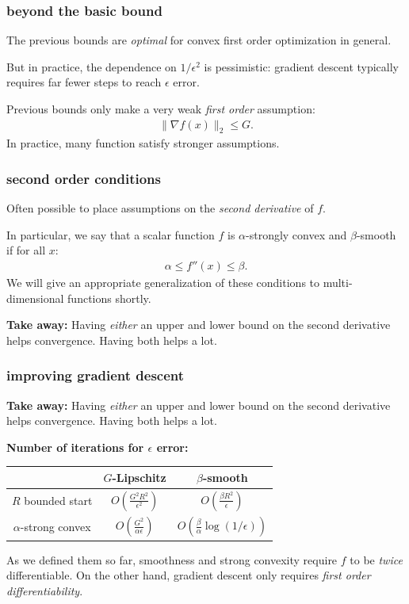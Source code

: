 \documentclass[compress]{beamer}
\begin{document}
\begin{frame}
	\frametitle{beyond the basic bound}
	The previous bounds are \emph{optimal} for convex first order optimization in general. 
	
	But in practice, the dependence on $1/\epsilon^2$ is  pessimistic: gradient descent typically requires far fewer steps to reach $\epsilon$ error. 

	Previous bounds only make a very weak \emph{first order} assumption: 
	\begin{align*}
		\|\nabla f(x)\|_2 \leq G.
	\end{align*}
	In practice, many function satisfy stronger assumptions. 
\end{frame}

\begin{frame}
	\frametitle{second order conditions}
	Often possible to place assumptions on the \emph{second derivative} of $f$. 
	
	In particular, we say that a scalar function $f$ is \alert{$\alpha$-strongly convex} and \alert{$\beta$-smooth} if for all $x$:
	\begin{align*}
		\alpha \leq f''(x) \leq \beta.
	\end{align*}
\alert{We will give an appropriate generalization of these conditions to multi-dimensional functions shortly.}

	\textbf{Take away:} Having \emph{either} an upper and lower bound on the second derivative helps convergence. Having both helps a lot.
\end{frame}

\begin{frame}
	\frametitle{improving gradient descent}
	\textbf{Take away:} Having \emph{either} an upper and lower bound on the second derivative helps convergence. Having both helps a lot.

	\textbf{Number of iterations for $\epsilon$ error:}
	\begin{center}
		\begin{tabular}{c|cc}
			& $G$-Lipschitz & $\beta$-smooth   \\ \hline
			$R$ bounded start & $O\left(\frac{G^2R^2}{\epsilon^2}\right)$ & $O\left(\frac{\beta R^2}{\epsilon}\right)$ \\
			$\alpha$-strong convex & $O\left(\frac{G^2}{\alpha\epsilon}\right)$ & $O\left(\frac{\beta}{\alpha}\log(1/\epsilon)\right)$
		\end{tabular}
	\end{center}
	As we defined them so far, smoothness and strong convexity require $f$ to be \emph{twice} differentiable. On the other hand, gradient descent only requires \emph{first order differentiability}.
\end{frame}
\end{document}
